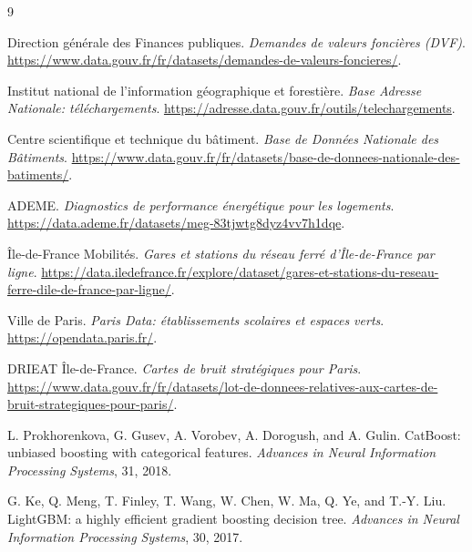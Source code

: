 \documentclass[11pt,a4paper]{article}
\begin{document}
\begin{thebibliography}{9}

Direction g\'en\'erale des Finances publiques.
\emph{Demandes de valeurs fonci\`eres (DVF)}.
\url{https://www.data.gouv.fr/fr/datasets/demandes-de-valeurs-foncieres/}.

Institut national de l'information g\'eographique et foresti\`ere.
\emph{Base Adresse Nationale: t\'el\'echargements}.
\url{https://adresse.data.gouv.fr/outils/telechargements}.

Centre scientifique et technique du b\^atiment.
\emph{Base de Donn\'ees Nationale des B\^atiments}.
\url{https://www.data.gouv.fr/fr/datasets/base-de-donnees-nationale-des-batiments/}.

ADEME.
\emph{Diagnostics de performance \'energ\'etique pour les logements}.
\url{https://data.ademe.fr/datasets/meg-83tjwtg8dyz4vv7h1dqe}.

\^Ile-de-France Mobilit\'es.
\emph{Gares et stations du r\'eseau ferr\'e d'\^Ile-de-France par ligne}.
\url{https://data.iledefrance.fr/explore/dataset/gares-et-stations-du-reseau-ferre-dile-de-france-par-ligne/}.

Ville de Paris.
\emph{Paris Data: \'etablissements scolaires et espaces verts}.
\url{https://opendata.paris.fr/}.

DRIEAT \^Ile-de-France.
\emph{Cartes de bruit strat\'egiques pour Paris}.
\url{https://www.data.gouv.fr/fr/datasets/lot-de-donnees-relatives-aux-cartes-de-bruit-strategiques-pour-paris/}.

L. Prokhorenkova, G. Gusev, A. Vorobev, A. Dorogush, and A. Gulin.
CatBoost: unbiased boosting with categorical features.
\emph{Advances in Neural Information Processing Systems}, 31, 2018.

G. Ke, Q. Meng, T. Finley, T. Wang, W. Chen, W. Ma, Q. Ye, and T.-Y. Liu.
LightGBM: a highly efficient gradient boosting decision tree.
\emph{Advances in Neural Information Processing Systems}, 30, 2017.

\end{thebibliography}
\end{document}
